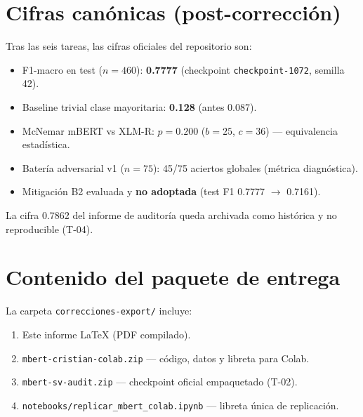 \section{Cifras canónicas (post-corrección)}

Tras las seis tareas, las cifras oficiales del repositorio son:

\begin{itemize}[noitemsep]
  \item F1-macro en test ($n=460$): \textbf{0.7777} (checkpoint \texttt{checkpoint-1072}, semilla 42).
  \item Baseline trivial clase mayoritaria: \textbf{0.128} (antes 0.087).
  \item McNemar mBERT vs XLM-R: $p=0.200$ ($b=25$, $c=36$) --- equivalencia estadística.
  \item Batería adversarial v1 ($n=75$): 45/75 aciertos globales (métrica diagnóstica).
  \item Mitigación B2 evaluada y \textbf{no adoptada} (test F1 0.7777 $\rightarrow$ 0.7161).
\end{itemize}

La cifra 0.7862 del informe de auditoría queda archivada como histórica y no reproducible (T-04).

\section{Contenido del paquete de entrega}

La carpeta \texttt{correcciones-export/} incluye:

\begin{enumerate}[noitemsep]
  \item Este informe LaTeX (PDF compilado).
  \item \texttt{mbert-cristian-colab.zip} --- código, datos y libreta para Colab.
  \item \texttt{mbert-sv-audit.zip} --- checkpoint oficial empaquetado (T-02).
  \item \texttt{notebooks/replicar\_mbert\_colab.ipynb} --- libreta única de replicación.
\end{enumerate}
